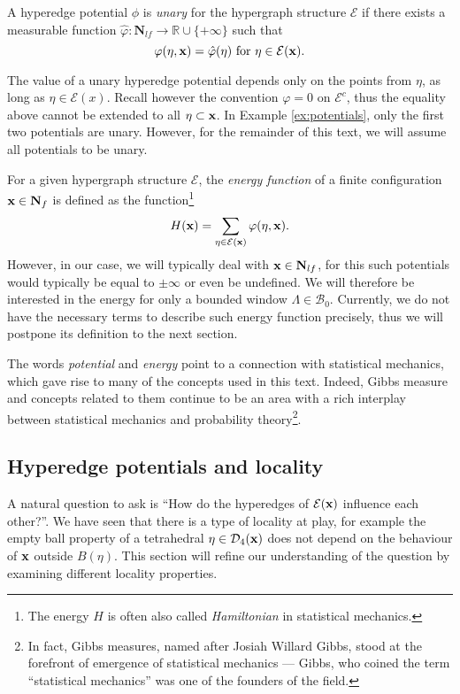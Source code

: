 \begin{definition}
	A hyperedge potential $\phi$ is \textit{unary} for the hypergraph structure $\mathcal E$ if there exists a measurable function $\hat\varphi:\mathbf N_{lf} \to \mathbb R \cup \{+\infty\}$ such that
	$$\varphi(\eta,{\mathbf{x}}) = \hat\varphi(\eta) \text{ for } \eta \in \mathcal E({\mathbf{x}}).$$
\end{definition}
The value of a unary hyperedge potential depends only on the points from $\eta$, as long as $\eta \in \mathcal E(x)$.  Recall however the convention $\varphi=0$ on $\mathcal E^c$, thus the equality above cannot be extended to all $\eta\subset {\mathbf{x}}$. 
In Example \ref{ex:potentials}, only the first two potentials are unary. However, for the remainder of this text, we will assume all potentials to be unary.\newline


For a given hypergraph structure $\mathcal E$, the \textit{energy function} of a finite configuration ${\mathbf{x}}\in \mathbf N_{f}$ is defined as the function\footnote{The energy $H$ is often also called \textit{Hamiltonian} in statistical mechanics.}
$$H({\mathbf{x}}) = \sum_{\eta \in \mathcal E({\mathbf{x}})} \varphi(\eta,{\mathbf{x}}).$$
However, in our case, we will typically deal with ${\mathbf{x}}\in \mathbf N_{lf}$, for this such potentials would typically be equal to $\pm \infty$ or even be undefined. We will therefore be interested in the energy for only a bounded window $\Lambda \in \mathcal B_0$. Currently, we do not have the necessary terms to describe such energy function precisely, thus we will postpone its definition to the next section. 

The words \textit{potential} and \textit{energy} point to a connection with statistical mechanics, which gave rise to many of the concepts used in this text. Indeed, Gibbs measure and concepts related to them continue to be an area with a rich interplay between statistical mechanics and probability theory\footnote{In fact, Gibbs measures, named after Josiah Willard Gibbs, stood at the forefront of emergence of statistical mechanics --- Gibbs, who coined the term ``statistical mechanics'' was one of the founders of the field.}.




\subsection{Hyperedge potentials and locality}
A natural question to ask is ``How do the hyperedges of $\mathcal E({\mathbf{x}})$ influence each other?''. We have seen that there is a type of locality at play, for example  the empty ball property of a tetrahedral $\eta\in\mathcal D_4({\mathbf{x}})$ does not depend on the behaviour of ${\mathbf{x}}$ outside $B(\eta)$. This section will refine our understanding of the question by examining different locality properties.

